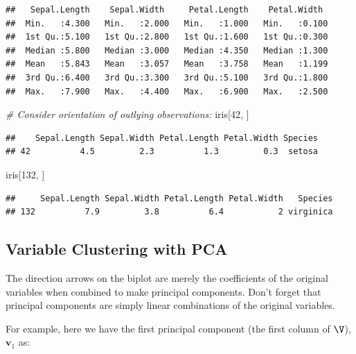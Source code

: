 \documentclass[
]{article}
\newenvironment{Shaded}{\begin{snugshade}}{\end{snugshade}}
\newcommand{\CommentTok}[1]{\textcolor[rgb]{0.56,0.35,0.01}{\textit{#1}}}
\newcommand{\DecValTok}[1]{\textcolor[rgb]{0.00,0.00,0.81}{#1}}
\newcommand{\NormalTok}[1]{#1}
\theoremstyle{definition}
\theoremstyle{definition}
\theoremstyle{definition}
\theoremstyle{definition}
\theoremstyle{remark}
\begin{document}
\begin{verbatim}
##   Sepal.Length    Sepal.Width     Petal.Length    Petal.Width   
##  Min.   :4.300   Min.   :2.000   Min.   :1.000   Min.   :0.100  
##  1st Qu.:5.100   1st Qu.:2.800   1st Qu.:1.600   1st Qu.:0.300  
##  Median :5.800   Median :3.000   Median :4.350   Median :1.300  
##  Mean   :5.843   Mean   :3.057   Mean   :3.758   Mean   :1.199  
##  3rd Qu.:6.400   3rd Qu.:3.300   3rd Qu.:5.100   3rd Qu.:1.800  
##  Max.   :7.900   Max.   :4.400   Max.   :6.900   Max.   :2.500
\end{verbatim}

\begin{Shaded}
\begin{Highlighting}[]
\CommentTok{\# Consider orientation of outlying observations:}
\NormalTok{iris[}\DecValTok{42}\NormalTok{, ]}
\end{Highlighting}
\end{Shaded}

\begin{verbatim}
##    Sepal.Length Sepal.Width Petal.Length Petal.Width Species
## 42          4.5         2.3          1.3         0.3  setosa
\end{verbatim}

\begin{Shaded}
\begin{Highlighting}[]
\NormalTok{iris[}\DecValTok{132}\NormalTok{, ]}
\end{Highlighting}
\end{Shaded}

\begin{verbatim}
##     Sepal.Length Sepal.Width Petal.Length Petal.Width   Species
## 132          7.9         3.8          6.4           2 virginica
\end{verbatim}

\hypertarget{variable-clustering-with-pca}{%
\subsection{Variable Clustering with PCA}\label{variable-clustering-with-pca}}

The direction arrows on the biplot are merely the coefficients of the original variables when combined to make principal components. Don't forget that principal components are simply linear combinations of the original variables.

For example, here we have the first principal component (the first column of \(\V\)), \(\mathbf{v}_1\) as:
\end{document}

